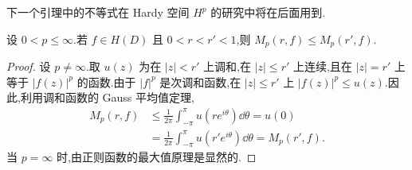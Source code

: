 下一个引理中的不等式在 Hardy 空间 $H^{p}$ 的研究中将在后面用到.

\begin{lemma}\label{lem:2.1.1}
设 $0 < p \leq \infty$.若 $f \in H(D)$ 且 $0 < r < r' < 1$,则 $M_{p}(r, f) \leq M_{p}(r', f)$.
\end{lemma}

\begin{proof}
设 $p \neq \infty$.取 $u(z)$ 为在 $|z| < r'$ 上调和,在 $|z| \leq r'$ 上连续,且在 $|z| = r'$ 上等于 $|f(z)|^{p}$ 的函数.由于 $|f|^{p}$ 是次调和函数,在 $|z| \leq r'$ 上 $|f(z)|^{p} \leq u(z)$.因此,利用调和函数的 Gauss 平均值定理,
\begin{align*}
M_{p}(r, f) & \leq \frac{1}{2\pi}\int_{-\pi}^{\pi}u(re^{i\theta})\dd\theta = u(0) \\
& = \frac{1}{2\pi}\int_{-\pi}^{\pi}u(r'e^{i\theta})\dd\theta = M_{p}(r', f).
\end{align*}
当 $p = \infty$ 时,由正则函数的最大值原理是显然的.
\end{proof}
